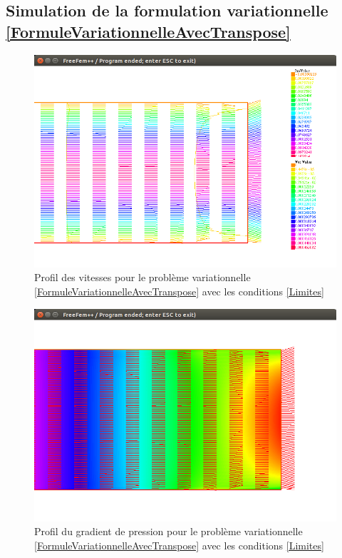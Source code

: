 \documentclass[11pt,a4paper]{article}
\numberwithin{equation}{subsection}
\numberwithin{figure}{subsection}
\begin{document}
\subsection{Simulation de la formulation variationnelle \ref{FormuleVariationnelleAvecTranspose}}

\begin{figure}[h]
\centering
\includegraphics[scale=0.4]{StokesConditionsTransposeVitesses.png}
\caption{Profil des vitesses pour le problème variationnelle \ref{FormuleVariationnelleAvecTranspose} avec les conditions \ref{Limites}}
\label{StokesLimitesTransposeVitesses}
\end{figure}

\begin{figure}[h]
\centering
\includegraphics[scale=0.4]{StokesConditionsTransposePression.png}
\caption{Profil du gradient de pression pour le problème variationnelle \ref{FormuleVariationnelleAvecTranspose} avec les conditions \ref{Limites}}
\label{StokesLimitesTransposePression}
\end{figure}
\end{document}
